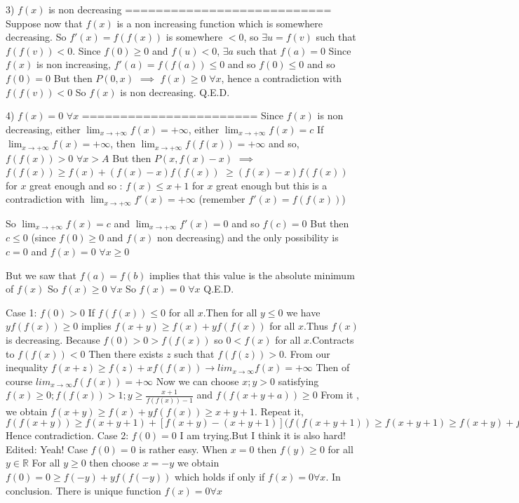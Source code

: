 \begin{solution}
3) $ f(x)$ is non decreasing
===========================
Suppose now that $ f(x)$ is a non increasing function which is somewhere decreasing.
So $ f'(x)=f(f(x))$ is somewhere $ <0$, so $ \exists u=f(v)$ such that $ f(f(v))<0$. 
Since $ f(0)\geq 0$  and $ f(u)<0$, $ \exists a$ such that $ f(a)=0$
Since $ f(x)$ is non increasing, $ f'(a)=f(f(a))\leq 0$ and so $ f(0)\leq 0$ and so $ f(0)=0$
But then $ P(0,x)$ $ \implies$ $ f(x)\geq 0$ $ \forall x$, hence a contradiction with $ f(f(v))<0$
So $ f(x)$ is non decreasing.
Q.E.D.

4) $ f(x)=0$ $ \forall x$
=======================
Since $ f(x)$ is non decreasing, either $ \lim_{x\to +\infty}f(x)=+\infty$, either $ \lim_{x\to +\infty}f(x)=c$
If $ \lim_{x\to +\infty}f(x)=+\infty$, then $ \lim_{x\to +\infty}f(f(x))=+\infty$ and so, $ f(f(x))>0$ $ \forall x>A$
But then $ P(x,f(x)-x)$ $ \implies$ $ f(f(x))\ge f(x)+(f(x)-x)f(f(x))$ $ \ge (f(x)-x)f(f(x))$ for $ x$ great enough and so :
$ f(x)\le x+1$ for $ x$ great enough but this is a contradiction with $ \lim_{x\to +\infty}f'(x)=+\infty$ (remember $ f'(x)=f(f(x))$)

So $ \lim_{x\to +\infty}f(x)=c$ and $ \lim_{x\to +\infty}f'(x)=0$ and so $ f(c)=0$
But then $ c\le 0$ (since $ f(0)\ge 0$ and $ f(x)$ non decreasing) and the only possibility is $ c=0$ and $ f(x)=0$ $ \forall x\ge 0$

But we saw that $ f(a)=f(b)$ implies that this value is the absolute minimum of $ f(x)$
So $ f(x)\ge 0$ $ \forall x$
So $ f(x)=0$ $ \forall x$ 
Q.E.D.
\end{solution}



\begin{solution}
	Case 1: $ f(0) > 0$
If $ f(f(x)) \le 0$ for all $ x$.Then for all $ y\le 0$ we have $ yf(f(x))\ge 0$ implies $ f(x + y)\ge f(x) + yf(f(x))$ for all $ x$.Thus $ f(x)$ is decreasing.
Because $ f(0) > 0 > f(f(x))$ so $ 0 < f(x)$ for all $ x$.Contracts to  $ f(f(x)) < 0$
Then there exists $ z$ such that $ f(f(z)) > 0$.
From our inequality $ f(x + z)\ge f(z) + xf(f(x))\rightarrow lim_{x\to \infty} f(x) = + \infty$
Then of course $ lim_{x\to \infty}f(f(x)) = + \infty$
Now we can choose $ x; y > 0$ satisfying $ f(x)\ge 0; f(f(x)) > 1; y\ge \frac {x + 1}{f(f(x)) - 1}$ and $ f(f(x + y + a)) \ge 0$
From it , we obtain $ f(x + y)\ge f(x) + yf(f(x))\ge x + y + 1$.
Repeat it, 
$ f(f(x + y))\ge f(x + y + 1) + [f(x + y) - (x + y + 1)](f(f(x + y + 1)) \ge f(x + y + 1)\ge f(x + y) + f(f(x + y))\ge f(x) + y(ff(x)) + f(f(x + y)) > f(f(x + y))$
Hence contradiction.
Case 2: $ f(0) = 0$
I am trying.But I think it is also hard!
Edited: 
Yeah! Case $ f(0)=0$ is rather easy.
When $ x=0$ then $ f(y)\ge 0$ for all $ y\in \mathbb R$
For all $ y\ge 0$ then choose $ x=-y$ we obtain $ f(0)=0\ge f(-y)+ yf(f(-y))$ which holds if only if $ f(x)=0 \forall x$.
In conclusion. There is unique function $ f(x)=0\forall x$
\end{solution}



